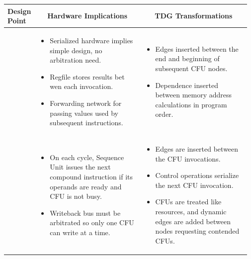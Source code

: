 \begin{table}[h]
\begin{adjustwidth}{-0.6in}{-0.6in}
\begin{center}
\setlength{\tabcolsep}{.18em}
\def\arraystretch{0.0}
\footnotesize 
\begin{tabular}{m{0.01\linewidth}@{}m{0.48\linewidth}m{0.48\linewidth}}

Design Point
& \multicolumn{1}{c}{\textbf{Hardware Implications}}
& \multicolumn{1}{c}{\textbf{TDG Transformations}}
\\   \midrule

\parbox[t]{3mm}{\hspace{0.1in}} 
& 
\begin{itemize}
\item \textbf{} Serialized hardware implies simple design, no arbitration need.
\item \textbf{} Regfile stores results bet wen each invocation.
\item \textbf{} Forwarding network for passing values used by subsequent instructions.
\end{itemize}


& 
\begin{itemize}
\item \textbf{} Edges inserted between the end and beginning of subsequent CFU nodes.
\item \textbf{} Dependence inserted between memory address calculations in program order.
\end{itemize}
\\ [-0.6\normalbaselineskip]  \midrule

\parbox[t]{1mm}{} 
& 
\begin{itemize}
\item \textbf{} On each cycle, Sequence Unit issues the next compound instruction if its operands are ready and CFU is not busy.
\item \textbf{} Writeback bus must be arbitrated so only one CFU can write at a time.
\end{itemize}
&
\begin{itemize}
\item \textbf{} Edges are inserted between the CFU invocations.
\item \textbf{} Control operations serialize the next CFU invocation.
\item \textbf{} CFUs are treated like resources, and dynamic edges are added between nodes
requesting contended CFUs.
\end{itemize}


\end{tabular}
\end{center}
\end{adjustwidth}
\end{table}
